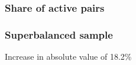 \documentclass{beamer}
\begin{document}
\begin{frame}[plain]\frametitle{Share of active pairs}
\begin{figure}[h!]
\begin{center}
\setlength{\fboxrule}{1pt} %
\setlength{\fboxsep}{.1in} %
\end{center}
\end{figure}
\end{frame}


\begin{frame}[plain]\frametitle{Superbalanced sample}
	\begin{figure}[h!]
		\begin{center}
			\setlength{\fboxrule}{1pt} %
			\setlength{\fboxsep}{.1in} %
		\end{center}
	\end{figure}
Increase in absolute value of 18.2\%
\end{frame}
\end{document}
